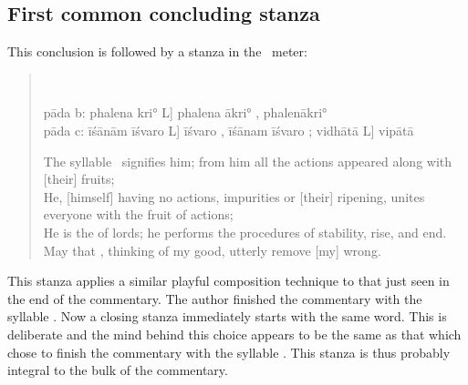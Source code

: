 \subsection{First common concluding stanza}
\label{krsnaverse}
This conclusion is followed by a stanza in the \sragdhara\ meter:
\begin{verse}
\\
{\footnotesize pāda b: phalena kri° L] phalena ākri° \Tmac, phalenākri° \Tmpc\\
pāda c: īśānām īśvaro L] īśvaro \Tmac, īśānam īśvaro \Tmpc; vidhātā L\Tmpc] vipātā \Tmac

}
The syllable \OM\ signifies him; from him all the actions appeared along with [their] fruits; \\ He, [himself] having no actions, impurities or [their] ripening, unites everyone with the fruit of actions; \\
  He is the  of lords; he performs the procedures of stability, rise, and end.\\ May that \Krsna, thinking of my good, utterly remove [my] wrong.
\end{verse}
This stanza applies a similar playful composition technique to that just seen in the end of the commentary. The author finished the commentary with the syllable \OM. Now a closing stanza immediately starts with the same word. This is deliberate and the mind behind this choice appears to be the same as that which chose to finish the commentary with the syllable \OM. This stanza is thus probably integral to the bulk of the commentary.

